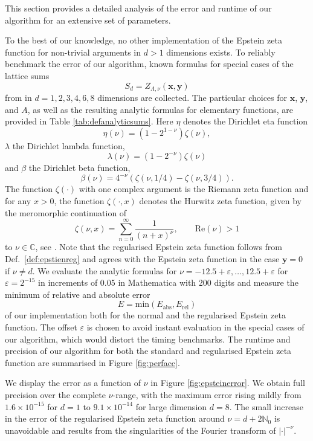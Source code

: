 \documentclass[]{amsart}
\newcommand{\new}[1]{#1}
\newcommand{\zeps}[3]{\new{Z_{#1} (#2, #3)}}
\renewcommand{\Re}[1]{\mathrm{Re}(#1)}
\numberwithin{mythm}{section}
\begin{document}
This section provides a detailed analysis of the error and runtime of our algorithm for an extensive set of parameters.
\new{
To the best of our knowledge, no other implementation of the Epstein zeta function for non-trivial arguments in $d>1$ dimensions exists.}
\new{To reliably }benchmark the error of our algorithm, known formulas for special cases of the lattice sums
\[
S_d=\zeps{\Lambda,\nu}{\bm x}{\bm y}
\]
from \cite{crandall2012unified,zucker2017exact,burrowsLatticeSumHexagonal2023} 
in $d=1,2,3,4,6,8$ dimensions are collected. 
The particular choices for $\bm x$, $\bm y$, and $A$, as well as the resulting analytic formulas for elementary functions, are provided in 
Table \ref{tab:defanalyticsums}. 
Here $\eta$ denotes the Dirichlet eta function
\[\eta(\nu)=(1-2^{1-\nu})\zeta(\nu),\]
$\lambda$ the Dirichlet lambda function, 
\[\lambda(\nu)=(1-2^{-\nu})\zeta(\nu)\]
and $\beta$ the Dirichlet beta function,  
\[\beta(\nu)
=4^{-\nu}(\zeta(\nu,1/4)-\zeta(\nu,3/4)).\]
The function \(\zeta(\cdot)\) with one complex argument is the Riemann zeta function and
for any $x>0$, the function \(\zeta(\cdot,x)\) denotes the Hurwitz zeta function, given by the meromorphic continuation of
\[\zeta(\nu,x)=\sum_{n=0}^{\infty}\frac{1}{(n+x)^{\nu}}
,\qquad
\Re\nu>1\]
to \(\nu\in\mathds{C}\),
see \cite[Section §25.11(i)]{NIST:DLMF}.
Note that the regularised Epstein zeta function follows from Def.~\ref{def:epstienreg} and agrees with the Epstein zeta function in the case $\bm y = 0$ if $\nu\neq d$. 
We evaluate the \new{analytic formulas} for $\nu=-12.5+\varepsilon,\dots,12.5+\varepsilon$ for \(\varepsilon = 2^{-15}\) in increments of 0.05 in Mathematica with 200 digits and measure the minimum of relative and absolute error \[E=\mathrm{min}(E_{\mathrm{abs}}, E_\mathrm{rel})\] of our implementation both for the normal and the regularised Epstein zeta function.
The offset \(\varepsilon\) is chosen to avoid instant evaluation in the special cases of our algorithm, which would distort the timing benchmarks.
The runtime and precision of our algorithm for both the standard and regularised Epstein zeta function are summarised in 
Figure \ref{fig:perfacc}.


We display the error as a function of \(\nu\) in Figure \ref{fig:epsteinerror}.
We obtain full precision over the complete $\nu$-range, with the maximum error rising mildly from \new{$1.6\times 10^{-15}$ for $d=1$ to $9.1\times 10^{-14}$} for large dimension $d=8$. The small increase in the error of the regularised Epstein zeta function around $\nu=d+2\mathds N_0$ is unavoidable and results from the singularities of the Fourier transform of $\vert \bm \cdot \vert^{-\nu}$.
\end{document}
